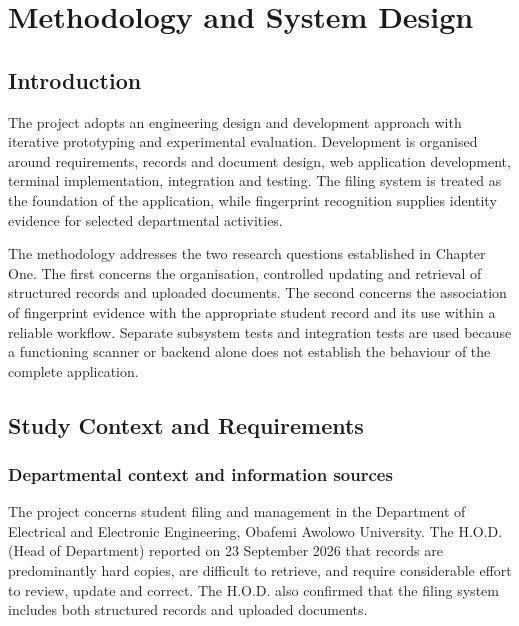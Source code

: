 \chapter{Methodology and System Design}\label{chap:3}

\section{Introduction}\label{sec:3-1}

The project adopts an engineering design and development approach with iterative prototyping and experimental evaluation. Development is organised around requirements, records and document design, web application development, terminal implementation, integration and testing. The filing system is treated as the foundation of the application, while fingerprint recognition supplies identity evidence for selected departmental activities.

The methodology addresses the two research questions established in Chapter One. The first concerns the organisation, controlled updating and retrieval of structured records and uploaded documents. The second concerns the association of fingerprint evidence with the appropriate student record and its use within a reliable workflow. Separate subsystem tests and integration tests are used because a functioning scanner or backend alone does not establish the behaviour of the complete application.

\section{Study Context and Requirements}\label{sec:3-2}

\subsection{Departmental context and information sources}\label{sec:3-2-1}

The project concerns student filing and management in the Department of Electrical and Electronic Engineering, Obafemi Awolowo University. The H.O.D. (Head of Department) reported on 23 September 2026 that records are predominantly hard copies, are difficult to retrieve, and require considerable effort to review, update and correct. The H.O.D. also confirmed that the filing system includes both structured records and uploaded documents.

